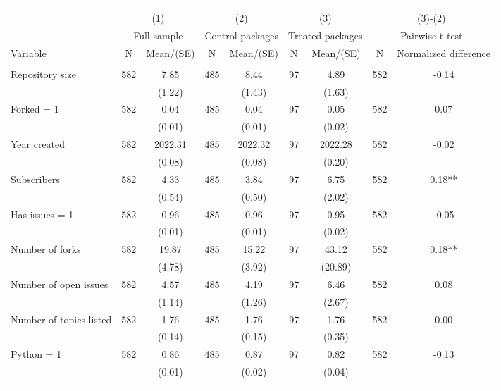 \begin{tabular}{@{\extracolsep{5pt}}lcccccccc}
\\[-1.8ex]\hline \hline \\[-1.8ex]
 & \multicolumn{2}{c}{(1)}  & \multicolumn{2}{c}{(2)}  & \multicolumn{2}{c}{(3)}  & \multicolumn{2}{c}{(3)-(2)} \\
 & \multicolumn{2}{c}{Full sample}  & \multicolumn{2}{c}{Control packages}  & \multicolumn{2}{c}{Treated packages}  & \multicolumn{2}{c}{Pairwise t-test}  \\
Variable & N & Mean/(SE) & N & Mean/(SE) & N & Mean/(SE) & N & Normalized difference \\ \hline \\[-1.8ex] 
Repository size   & 582    & 7.85    & 485    & 8.44    & 97    & 4.89    & 582    & -0.14   \\
 &   & (1.22)  &   & (1.43)  &   & (1.63)  &   &  \\ [1ex]
Forked = 1   & 582    & 0.04    & 485    & 0.04    & 97    & 0.05    & 582    & 0.07   \\
 &   & (0.01)  &   & (0.01)  &   & (0.02)  &   &  \\ [1ex]
Year created   & 582    & 2022.31    & 485    & 2022.32    & 97    & 2022.28    & 582    & -0.02   \\
 &   & (0.08)  &   & (0.08)  &   & (0.20)  &   &  \\ [1ex]
Subscribers   & 582    & 4.33    & 485    & 3.84    & 97    & 6.75    & 582    & 0.18**   \\
 &   & (0.54)  &   & (0.50)  &   & (2.02)  &   &  \\ [1ex]
Has issues = 1   & 582    & 0.96    & 485    & 0.96    & 97    & 0.95    & 582    & -0.05   \\
 &   & (0.01)  &   & (0.01)  &   & (0.02)  &   &  \\ [1ex]
Number of forks   & 582    & 19.87    & 485    & 15.22    & 97    & 43.12    & 582    & 0.18**   \\
 &   & (4.78)  &   & (3.92)  &   & (20.89)  &   &  \\ [1ex]
Number of open issues   & 582    & 4.57    & 485    & 4.19    & 97    & 6.46    & 582    & 0.08   \\
 &   & (1.14)  &   & (1.26)  &   & (2.67)  &   &  \\ [1ex]
Number of topics listed   & 582    & 1.76    & 485    & 1.76    & 97    & 1.76    & 582    & 0.00   \\
 &   & (0.14)  &   & (0.15)  &   & (0.35)  &   &  \\ [1ex]
Python = 1   & 582    & 0.86    & 485    & 0.87    & 97    & 0.82    & 582    & -0.13   \\
 &   & (0.01)  &   & (0.02)  &   & (0.04)  &   &  \\ [1ex]
\hline \hline \\[-1.8ex]

\end{tabular}
